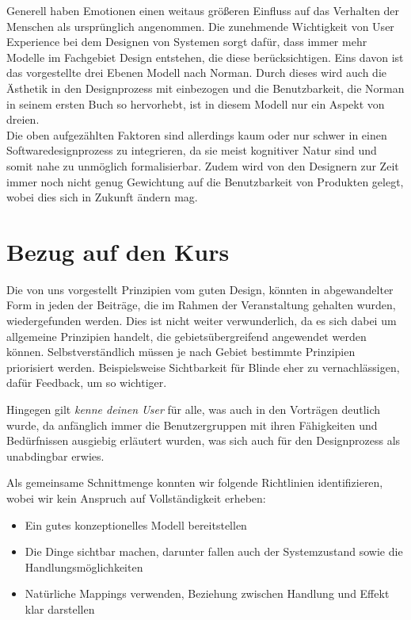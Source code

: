 \documentclass[parskip,headsepline, headtopline, %
footsepline, oneside, 12pt, headings=small]{scrreprt}
\begin{document}
Generell haben Emotionen einen weitaus größeren Einfluss auf das Verhalten der Menschen als ursprünglich angenommen. Die zunehmende Wichtigkeit von User Experience bei dem Designen von Systemen sorgt dafür, dass immer mehr Modelle im Fachgebiet Design entstehen, die diese berücksichtigen.
Eins davon ist das vorgestellte drei Ebenen Modell nach Norman. Durch dieses wird auch die Ästhetik in den Designprozess mit einbezogen und die Benutzbarkeit, die Norman in seinem ersten Buch so hervorhebt, ist in diesem Modell nur ein Aspekt von dreien. \\
Die oben aufgezählten Faktoren sind allerdings kaum oder nur schwer in einen Softwaredesignprozess zu integrieren, da sie meist kognitiver Natur sind und somit nahe zu unmöglich formalisierbar. Zudem  wird von den Designern zur Zeit immer noch nicht genug Gewichtung auf die Benutzbarkeit von Produkten gelegt, wobei dies sich in Zukunft ändern mag.


\section{Bezug auf den Kurs}

Die von uns vorgestellt Prinzipien vom guten Design, könnten in abgewandelter Form in jeden der Beiträge, die im Rahmen der Veranstaltung gehalten wurden, wiedergefunden werden. Dies ist nicht weiter verwunderlich, da es sich dabei um allgemeine Prinzipien handelt, die gebietsübergreifend angewendet werden können. Selbstverständlich müssen je nach Gebiet bestimmte Prinzipien priorisiert werden. Beispielsweise Sichtbarkeit für Blinde eher zu vernachlässigen, dafür Feedback, um so wichtiger.

Hingegen gilt \textit{kenne deinen User} für alle, was auch in den Vorträgen deutlich wurde, da anfänglich immer die Benutzergruppen mit ihren Fähigkeiten und Bedürfnissen ausgiebig erläutert wurden, was sich auch für den Designprozess als unabdingbar erwies.  \newpage

Als gemeinsame Schnittmenge konnten wir folgende Richtlinien identifizieren, wobei wir kein Anspruch auf Vollständigkeit erheben:
\begin{itemize}
\item Ein gutes konzeptionelles Modell bereitstellen
\item Die Dinge sichtbar machen, darunter fallen auch der Systemzustand sowie die Handlungsmöglichkeiten
\item Natürliche Mappings verwenden, Beziehung zwischen Handlung und Effekt klar darstellen
\end{itemize}
\end{document}
